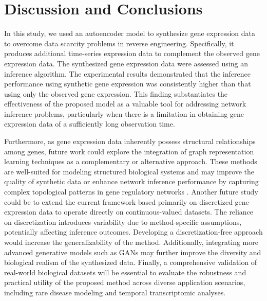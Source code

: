 \section{Discussion and Conclusions}
In this study, we used an autoencoder model to synthesize gene expression data to overcome data scarcity problems in reverse engineering. Specifically, it produces additional time-series expression data to complement the observed gene expression data. The synthesized gene expression data were assessed using an inference algorithm. The experimental results demonstrated that the inference performance using synthetic gene expression was consistently higher than that using only the observed gene expression. This finding substantiates the effectiveness of the proposed model as a valuable tool for addressing network inference problems, particularly when there is a limitation in obtaining gene expression data of a sufficiently long observation time. \par
{Furthermore, as gene expression data inherently possess structural relationships among genes, future work could explore the integration of graph representation learning techniques as a complementary or alternative approach. These methods are well-suited for modeling structured biological systems and may improve the quality of synthetic data or enhance network inference performance by capturing complex topological patterns in gene regulatory networks \parencite{Chen2020, Li2024}. Another future study could be to extend the current framework based primarily on discretized gene expression data to operate directly on continuous-valued datasets. The reliance on discretization introduces variability due to method-specific assumptions, potentially affecting inference outcomes. Developing a discretization-free approach would increase the generalizability of the method. Additionally, integrating more advanced generative models such as GANs may further improve the diversity and biological realism of the synthesized data. Finally, a comprehensive validation of real-world biological datasets will be essential to evaluate the robustness and practical utility of the proposed method across diverse application scenarios, including rare disease modeling and temporal transcriptomic analyses}.


